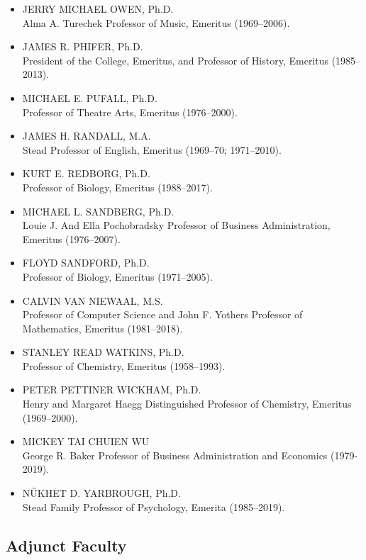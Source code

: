 \documentclass[
  letterpaper,
]{scrbook}
\begin{document}
\begin{itemize}
\item
  JERRY MICHAEL OWEN, Ph.D.\\
  Alma A. Turechek Professor of Music, Emeritus (1969--2006).
\item
  JAMES R. PHIFER, Ph.D.\\
  President of the College, Emeritus, and Professor of History, Emeritus
  (1985--2013).
\item
  MICHAEL E. PUFALL, Ph.D.\\
  Professor of Theatre Arts, Emeritus (1976--2000).
\item
  JAMES H. RANDALL, M.A.\\
  Stead Professor of English, Emeritus (1969--70; 1971--2010).
\item
  KURT E. REDBORG, Ph.D.\\
  Professor of Biology, Emeritus (1988--2017).
\item
  MICHAEL L. SANDBERG, Ph.D.\\
  Louie J. And Ella Pochobradsky Professor of Business Administration,
  Emeritus (1976--2007).
\item
  FLOYD SANDFORD, Ph.D.\\
  Professor of Biology, Emeritus (1971--2005).
\item
  CALVIN VAN NIEWAAL, M.S.\\
  Professor of Computer Science and John F. Yothers Professor of
  Mathematics, Emeritus (1981--2018).
\item
  STANLEY READ WATKINS, Ph.D.\\
  Professor of Chemistry, Emeritus (1958--1993).
\item
  PETER PETTINER WICKHAM, Ph.D.\\
  Henry and Margaret Haegg Distinguished Professor of Chemistry,
  Emeritus (1969--2000).
\item
  MICKEY TAI CHUIEN WU\\
  George R. Baker Professor of Business Administration and Economics
  (1979-2019).
\item
  NŰKHET D. YARBROUGH, Ph.D.\\
  Stead Family Professor of Psychology, Emerita (1985--2019).
\end{itemize}

\hypertarget{adjunct-faculty}{%
\subsection{Adjunct Faculty}\label{adjunct-faculty}}
\end{document}
